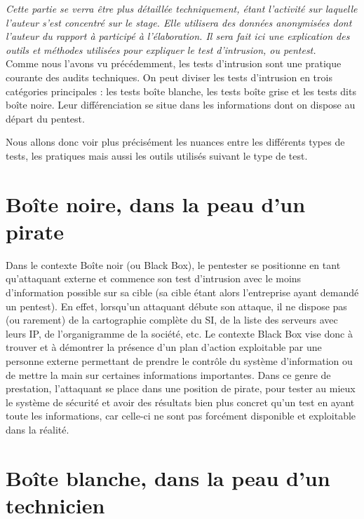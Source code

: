 \documentclass[a4paper]{memoir}
\begin{document}
\textit{Cette partie se verra être plus détaillée techniquement, étant l'activité sur laquelle l'auteur s'est concentré sur le stage. Elle utilisera des données anonymisées dont l'auteur du rapport à participé à l'élaboration. Il sera fait ici une explication des outils et méthodes utilisées pour expliquer le test d'intrusion, ou pentest.}\\

Comme nous l'avons vu précédemment, les tests d'intrusion sont une pratique courante des audits techniques. On peut diviser les tests d'intrusion en trois catégories principales : les tests boîte blanche, les tests boîte grise et les tests dits boîte noire. Leur différenciation se situe dans les informations dont on dispose au départ du pentest. 

Nous allons donc voir plus précisément les nuances entre les différents types de tests, les pratiques mais aussi les outils utilisés suivant le type de test.\\

\section{Boîte noire, dans la peau d'un pirate}

Dans le contexte Boîte noir (ou Black Box), le pentester se positionne en tant qu’attaquant externe et commence son test d’intrusion avec le moins d’information possible sur sa cible (sa cible étant alors l'entreprise ayant demandé un pentest). En effet, lorsqu’un attaquant débute son attaque, il ne dispose pas (ou rarement) de la cartographie complète du SI, de la liste des serveurs avec leurs IP, de l'organigramme de la société, etc. Le contexte Black Box vise donc à trouver et à démontrer la présence d’un plan d’action exploitable par une personne externe permettant de prendre le contrôle du système d’information ou de mettre la main sur certaines informations importantes.
Dans ce genre de prestation, l'attaquant se place dans une position de pirate, pour tester au mieux le système de sécurité et avoir des résultats bien plus concret qu'un test en ayant toute les informations, car celle-ci ne sont pas forcément disponible et exploitable dans la réalité.

\section{Boîte blanche, dans la peau d'un technicien} 
\end{document}
